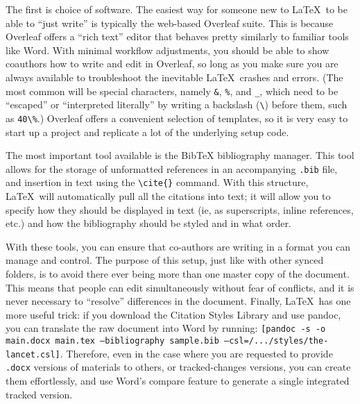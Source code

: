 The first is choice of software. The easiest way
for someone new to \LaTeX\ to be able to ``just write''
is typically the web-based Overleaf suite.
This is because Overleaf offers a ``rich text'' editor
that behaves pretty similarly to familiar tools like Word.
With minimal workflow adjustments, you should be able
to show coauthors how to write and edit in Overleaf,
so long as you make sure you are always available to troubleshoot
the inevitable \LaTeX\ crashes and errors.
(The most common will be special characters, namely
\texttt{\&}, \texttt{\%}, and \texttt{\_},
which need to be ``escaped'' or ``interpreted literally''
by writing a backslash (\texttt{\textbackslash}) before them,
such as  \texttt{40\textbackslash\%}.)
Overleaf offers a convenient selection of templates,
so it is very easy to start up a project
and replicate a lot of the underlying setup code.

The most important tool available is the BibTeX bibliography manager.
This tool allows for the storage of unformatted references
in an accompanying \texttt{.bib} file, and insertion in text
using the \texttt{\textbackslash cite\{\}} command.
With this structure, \LaTeX\ will automatically pull
all the citations into text; it will allow you to specify
how they should be displayed in text
(ie, as superscripts, inline references, etc.)
and how the bibliography should be styled and in what order.

With these tools, you can ensure that co-authors are writing
in a format you can manage and control.
The purpose of this setup, just like with other synced folders,
is to avoid there ever being more than one master copy of the document.
This means that people can edit simultaneously without fear of conflicts,
and it is never necessary to ``resolve'' differences in the document.
Finally, \LaTeX\ has one more useful trick:
if you download the Citation Styles Library
and use pandoc,
you can translate the raw document into Word by running:
\texttt{[pandoc -s -o main.docx main.tex --bibliography sample.bib --csl=/.../styles/the-lancet.csl]}.
Therefore, even in the case where you are requested to provide
\texttt{.docx} versions of materials to others, or tracked-changes versions,
you can create them effortlessly,
and use Word's compare feature to generate a single integrated tracked version.

